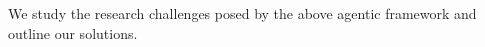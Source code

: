 %
%



We study the research challenges posed by the above agentic framework and outline our solutions.

